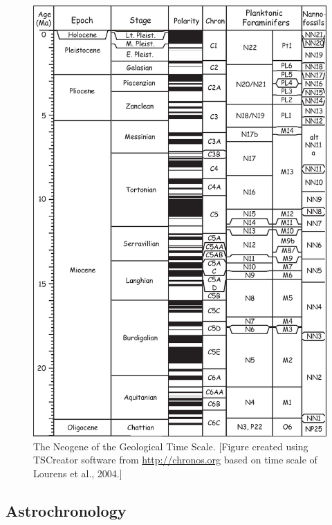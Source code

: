 \begin{figure}[h!tb]
\centering  \includegraphics[width=13 cm]{EPSfiles/neogene.eps}
\caption{The Neogene of the Geological Time Scale. [Figure created using TSCreator software from \href{http://chronos.org}{http://chronos.org} based on time scale of Lourens et al., 2004.]}
\label{fig:neogene}
\end{figure}

\clearpage

\subsection{Astrochronology}

